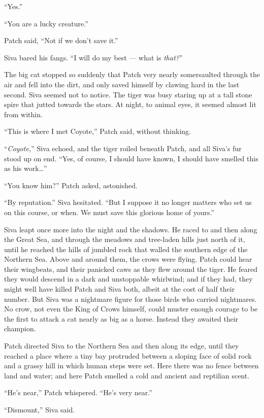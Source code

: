 \documentclass[ebook,oneside,openany,17pt]{memoir}
\begin{document}
“Yes.”

“You are a lucky creature.”

Patch said, “Not if we don’t save it.”

Siva bared his fangs. “I will do my best — what is \emph{that?}”

The big cat stopped so suddenly that Patch very nearly somersaulted
through the air and fell into the dirt, and only saved himself by
clawing hard in the last second. Siva seemed not to notice. The tiger
was busy staring up at a tall stone spire that jutted towards the
stars. At night, to animal eyes, it seemed almost lit from within.

“This is where I met Coyote,” Patch said, without thinking.

“\emph{Coyote,}” Siva echoed, and the tiger roiled beneath Patch,
and all Siva’s fur stood up on end. “Yes, of course, I should have
known, I should have smelled this as his work…”

“You know him?” Patch asked, astonished.

“By reputation.” Siva hesitated. “But I suppose it no longer matters
who set us on this course, or when. We must save this glorious home of
yours.”

Siva leapt once more into the night and the shadows. He raced to and
then along the Great Sea, and through the meadows and tree-laden hills
just north of it, until he reached the hills of jumbled rock that
walled the southern edge of the Northern Sea. Above and around them,
the crows were flying. Patch could hear their wingbeats, and their
panicked caws as they flew around the tiger. He feared they would
descend in a dark and unstoppable whirlwind; and if they had, they
might well have killed Patch and Siva both, albeit at the cost of half
their number. But Siva was a nightmare figure for those birds who
carried nightmares. No crow, not even the King of Crows himself, could
muster enough courage to be the first to attack a cat nearly as big as
a horse. Instead they awaited their champion.

Patch directed Siva to the Northern Sea and then along its edge, until
they reached a place where a tiny bay protruded between a sloping face
of solid rock and a grassy hill in which human steps were set. Here
there was no fence between land and water; and here Patch smelled a
cold and ancient and reptilian scent.

“He’s near,” Patch whispered. “He’s very near.”

“Dismount,” Siva said.
\end{document}
